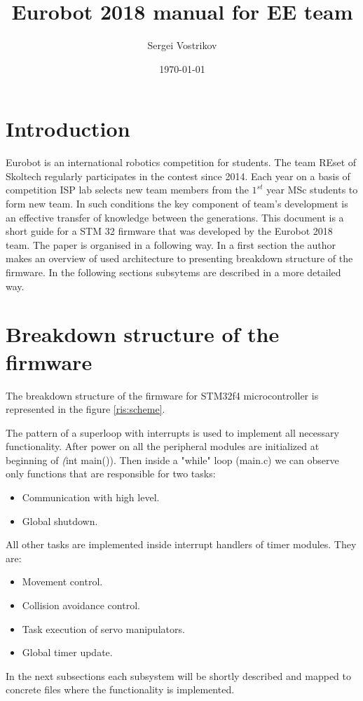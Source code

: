 \documentclass[a4paper,12pt]{article} %
\author{Sergei Vostrikov}
\title{Eurobot 2018 manual for EE team}
\date{\today}
\begin{document}

\maketitle

\newpage
\section*{Introduction}
Eurobot is an international robotics competition for students. The team REset of Skoltech regularly participates in the contest since 2014. Each year on a basis of competition ISP lab selects new team members from the $1^{st}$ year MSc students to form new team. In such conditions the key component of team's development is an effective transfer of knowledge between the generations. This document is a short guide for a STM 32 firmware that was developed by the Eurobot 2018 team. The paper is organised in a following way. In a first section the author makes an overview of used architecture to presenting breakdown structure of the firmware. In the following sections subsytems are described in a more detailed way.

\section{Breakdown structure of the firmware}
The breakdown structure of the firmware for STM32f4 microcontroller is represented in the figure \ref{ris:scheme}. 

The pattern of a superloop with interrupts is used to implement all necessary functionality. After power on all the peripheral modules are initialized at beginning of \textit(int main()). Then inside a "while" loop (main.c) we can observe only functions that are responsible for two tasks:
\begin{itemize}
	\item Communication with high level.
	\item Global shutdown.
\end{itemize}
All other tasks are implemented inside interrupt handlers of timer modules. They are:
\begin{itemize}
	\item Movement control.
	\item Collision avoidance control.
	\item Task execution of servo manipulators.
	\item Global timer update.
\end{itemize}
In the next subsections each subsystem will be shortly described and mapped to concrete files where the functionality is implemented.
\end{document}
